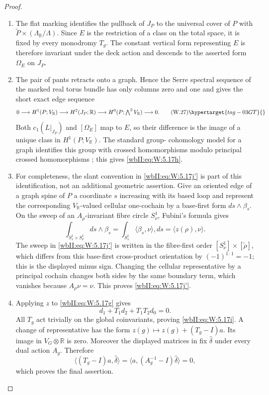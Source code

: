 \begin{proof}

\begin{enumerate}[label={$\langle1\rangle$\arabic*.},leftmargin=*]
\item The flat marking identifies the pullback of $J_P$ to the universal cover of
$P$ with
$\widetilde P\times(\Lambda_{\mathbb R}/\Lambda)$.  Since $E$ is the
restriction of a class on the total space, it is fixed by every monodromy
$T_g$.  The constant vertical form representing $E$ is therefore invariant
under the deck action and descends to the asserted form $\Omega_E$ on
$J_P$.

\item The pair of pants retracts onto a graph.  Hence the Serre spectral sequence
of the marked real torus bundle has only columns zero and one and gives the
short exact edge sequence
\[
0\longrightarrow H^1(P;V_{\mathbb R})
 \longrightarrow H^2(J_P;\mathbb R)
 \longrightarrow H^0(P;\textstyle\bigwedge^2V_{\mathbb R})
 \longrightarrow0.
\tag{W.27}\hypertarget{tag-03GT}{}\label{wbII:eq:W:5.17j}
\]
Both $c_1(L|_{J_P})$ and $[\Omega_E]$ map to $E$, so their difference is
the image of a unique class in $H^1(P;V_{\mathbb R})$.  The standard group-
cohomology model for a graph identifies this group with crossed
homomorphisms modulo principal crossed homomorphisms
\cite[Chapter~III, \S1, Exercise~2, p.~60; Chapter~IV, \S2, pp.~88--89]{Brown1982}; this gives \eqref{wbII:eq:W:5.17h}.

\item For completeness, the slant convention in \eqref{wbII:eq:W:5.17j'} is part of this
identification, not an additional geometric assertion.  Give an oriented
edge of a graph spine of $P$ a coordinate $s$ increasing with its based
loop and represent the corresponding $V_{\mathbb R}$-valued cellular
one-cochain by a base-first form $ds\wedge\beta_s$.  On the sweep of an
$A_\rho$-invariant fibre circle $S^1_\nu$, Fubini's formula gives
\[
\int_{S^1_s\times S^1_\nu}ds\wedge\beta_s
 =\int_{S^1_s}\langle\beta_s,\nu\rangle,ds
 =\langle z(\rho),\nu\rangle.
\]
The sweep in \eqref{wbII:eq:W:5.17j'} is written in the fibre-first order
$[S^1_\nu]\times[\widetilde\rho]$, which differs from this base-first
cross-product orientation by $(-1)^{1\cdot1}=-1$; this is the displayed
minus sign.
Changing the cellular representative by a principal cochain changes both
sides by the same boundary term, which vanishes because $A_\rho\nu=\nu$.
This proves \eqref{wbII:eq:W:5.17j'}.

\item Applying $z$ to \eqref{wbII:eq:W:5.17g} gives
\[
 d_1+T_1d_2+T_1T_2d_0=0.
\]
All $T_g$ act trivially on the global coinvariants, proving \eqref{wbII:eq:W:5.17i}.  A
change of representative has the form
$z(g)\mapsto z(g)+(T_g-I)a$.  Its image in $V_G\otimes\mathbb R$ is zero.
Moreover the displayed matrices in
 fix $\widehat\delta$ under every dual
action $A_g$.  Therefore
\[
 \langle(T_g-I)a,\widehat\delta\rangle
 =\langle a,(A_g^{-1}-I)\widehat\delta\rangle=0,
\]
which proves the final assertion.

\end{enumerate}
\end{proof}